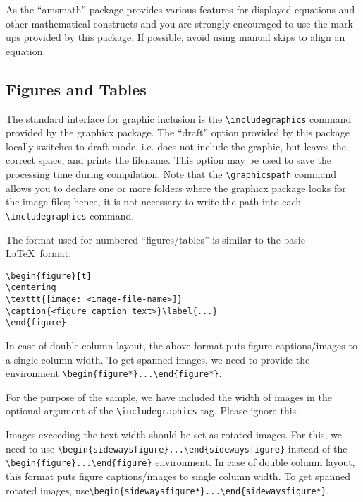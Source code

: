 \documentclass{article}
\begin{document}
As the ``amsmath'' package provides various features for displayed
equations and other mathematical constructs and you are strongly
encouraged to use the mark-ups provided by this package. If
possible, avoid using manual skips to align an equation.

\subsection{Figures and Tables}
The standard interface for graphic inclusion is the \verb+\includegraphics+ command provided by the graphicx package. The ``draft'' option provided by this package locally switches to draft mode, i.e. does not include the graphic, but leaves the correct space, and prints the filename. This option may be used to save the processing time during compilation. Note that the \verb+\graphicspath+ command allows you to declare one or more folders where the graphicx package looks for the image files; hence, it is not necessary to write the path into each \verb+\includegraphics+ command.

The format used for numbered ``figures/tables'' is similar to the basic \LaTeX\ format:

\begin{verbatim}
\begin{figure}[t]
\centering
\texttt{[image: <image-file-name>]}
\caption{<figure caption text>}\label{...}
\end{figure}
\end{verbatim}

In case of double column layout, the above format puts figure captions/images to a single column width. To get spanned images, we need to provide the environment
\verb+\begin{figure*}...\end{figure*}+.

For the purpose of the sample, we have included the width of images in the optional argument of the \verb+\includegraphics+ tag. Please ignore this.

Images exceeding the text width should be set as rotated images. For this, we need to use \verb+\begin{sidewaysfigure}...\end{sidewaysfigure}+ instead of the \verb+\begin{figure}...\end{figure}+ environment. In case of double column layout, this format puts figure captions/images to single column width. To get spanned rotated images, use\newline \verb+\begin{sidewaysfigure*}...\end{sidewaysfigure*}+.
\end{document}
